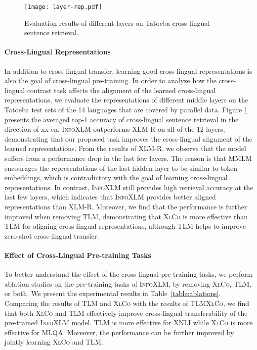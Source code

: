\documentclass[11pt,a4paper]{article}
\newcommand\our{\textsc{InfoXLM}}
\newcommand\xlco{\textsc{XlCo}}
\begin{document}
\begin{figure}[t]
\begin{center} 
\texttt{[image: layer-rep.pdf]}
\caption{Evaluation results of different layers on Tatoeba cross-lingual sentence retrieval.}
\label{fig:layerrep}
\end{center} 
\end{figure}

\paragraph{Cross-Lingual Representations}

In addition to cross-lingual transfer, learning good cross-lingual representations is also the goal of cross-lingual pre-training. 
In order to analyze how the cross-lingual contrast task affects the alignment of the learned cross-lingual representations,  we evaluate the representations of different middle layers on the Tatoeba test sets of the 14 languages that are covered by parallel data.
Figure \ref{fig:layerrep} presents the averaged top-1 accuracy of cross-lingual sentence retrieval in the direction of xx  en. 
\our{} outperforms \textsc{XLM-R} on all of the 12 layers, demonstrating that our proposed task improves the cross-lingual alignment of the learned representations.
From the results of XLM-R, we observe that the model suffers from a performance drop in the last few layers.
The reason is that MMLM encourages the representations of the last hidden layer to be similar to token embeddings, which is contradictory with the goal of learning cross-lingual representations.
In contrast, \our{} still provides high retrieval accuracy at the last few layers, which indicates that \our{} provides better aligned representations than XLM-R.
Moreover, we find that the performance is further improved when removing TLM, demonstrating that \xlco{} is more effective than TLM for aligning cross-lingual representations, although TLM helps to improve zero-shot cross-lingual transfer.

\paragraph{Effect of Cross-Lingual Pre-training Tasks}
To better understand the effect of the cross-lingual pre-training tasks, we perform ablation studies on the pre-training tasks of \our{}, by removing \xlco{}, TLM, or both.
We present the experimental results in Table~\ref{table:ablations}.
Comparing the results of TLM and \xlco{} with the results of TLM\xlco{},
we find that both \xlco{} and TLM effectively improve cross-lingual transferability of the pre-trained \our{} model. TLM is more effective for XNLI while \xlco{} is more effective for MLQA. Moreover, the performance can be further improved by jointly learning \xlco{} and TLM.
\end{document}
